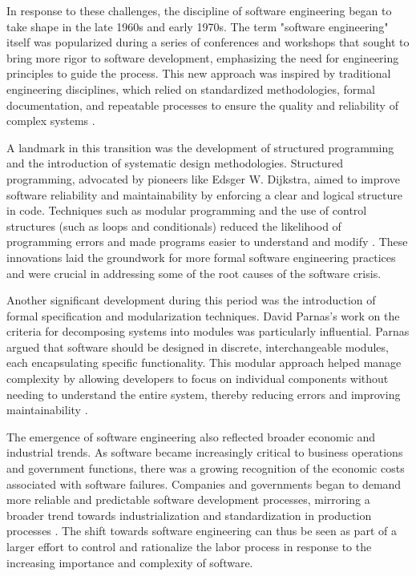 \begin{refsection}
In response to these challenges, the discipline of software engineering began to take shape in the late 1960s and early 1970s. The term "software engineering" itself was popularized during a series of conferences and workshops that sought to bring more rigor to software development, emphasizing the need for engineering principles to guide the process. This new approach was inspired by traditional engineering disciplines, which relied on standardized methodologies, formal documentation, and repeatable processes to ensure the quality and reliability of complex systems \cite[pp.~24-27]{fredrick2019software}.

A landmark in this transition was the development of structured programming and the introduction of systematic design methodologies. Structured programming, advocated by pioneers like Edsger W. Dijkstra, aimed to improve software reliability and maintainability by enforcing a clear and logical structure in code. Techniques such as modular programming and the use of control structures (such as loops and conditionals) reduced the likelihood of programming errors and made programs easier to understand and modify \cite[pp.~97-99]{dijkstra1968goto}. These innovations laid the groundwork for more formal software engineering practices and were crucial in addressing some of the root causes of the software crisis.

Another significant development during this period was the introduction of formal specification and modularization techniques. David Parnas's work on the criteria for decomposing systems into modules was particularly influential. Parnas argued that software should be designed in discrete, interchangeable modules, each encapsulating specific functionality. This modular approach helped manage complexity by allowing developers to focus on individual components without needing to understand the entire system, thereby reducing errors and improving maintainability \cite[pp.~1056-1058]{parnas1972criteria}.

The emergence of software engineering also reflected broader economic and industrial trends. As software became increasingly critical to business operations and government functions, there was a growing recognition of the economic costs associated with software failures. Companies and governments began to demand more reliable and predictable software development processes, mirroring a broader trend towards industrialization and standardization in production processes \cite[pp.~58-61]{braverman1974labor}. The shift towards software engineering can thus be seen as part of a larger effort to control and rationalize the labor process in response to the increasing importance and complexity of software.


\end{refsection}
